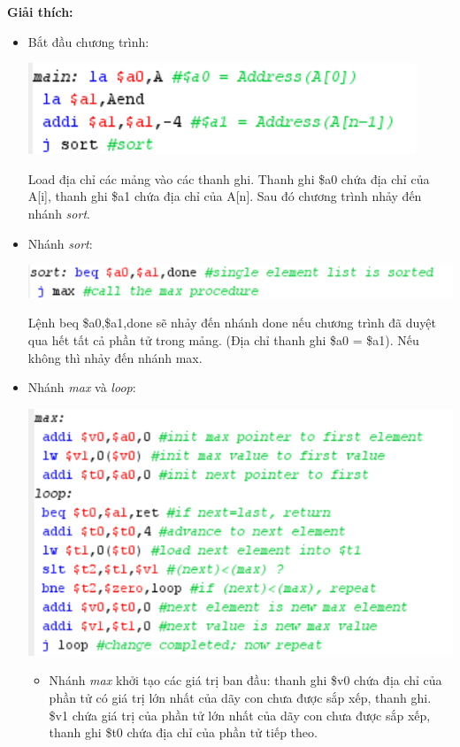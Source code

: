\documentclass[12pt,a4paper,oneside]{article}
\begin{document}
\textbf{Giải thích:}
\begin{itemize}
	\item Bắt đầu chương trình:
		\begin{center}
		\includegraphics[scale=1]{2.1}
		\end{center}
	Load địa chỉ các mảng vào các thanh ghi. Thanh ghi \$a0 chứa địa chỉ của A[i], thanh ghi \$a1 chứa địa chỉ của A[n]. Sau đó chương trình nhảy đến nhánh \textit{sort}. 
	\item Nhánh \textit{sort}:
		\begin{center}
		\includegraphics[scale=1]{2.2}
		\end{center}
	Lệnh \colorbox{code}{beq \$a0,\$a1,done} sẽ nhảy đến nhánh done nếu chương trình đã duyệt qua hết tất cả phần tử trong mảng. (Địa chỉ thanh ghi \$a0 = \$a1). Nếu không thì nhảy đến nhánh max.
	\item Nhánh \textit{max} và \textit{loop}:
		\begin{center}
		\includegraphics[scale=1]{2.3}
		\end{center}
	\begin{itemize}
		\item Nhánh \textit{max} khởi tạo các giá trị ban đầu: thanh ghi \$v0 chứa địa chỉ của phần tử có giá trị lớn nhất của dãy con chưa được sắp xếp, thanh ghi. \$v1 chứa giá trị của phần tử lớn nhất của dãy con chưa được sắp xếp, thanh ghi \$t0 chứa địa chỉ của phần tử tiếp theo.

\end{itemize}
\end{itemize}
\end{document}
